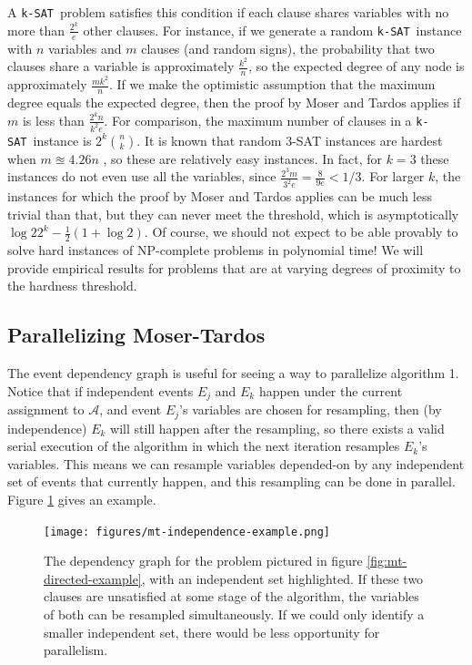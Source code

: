 \documentclass[twocolumn]{article}
\newcommand{\ksat}{\texttt{k-SAT}~}
\begin{document}
A \ksat problem satisfies this condition if each clause shares variables with no more than $\frac{2^k}{e}$ other clauses.  For instance, if we generate a random \ksat instance with $n$ variables and $m$ clauses (and random signs), the probability that two clauses share a variable is approximately $\frac{k^2}{n}$, so the expected degree of any node is approximately $\frac{m k^2}{n}$.  If we make the optimistic assumption that the maximum degree equals the expected degree, then the proof by Moser and Tardos applies if $m$ is less than $\frac{2^k n}{k^2 e}$.  For comparison, the maximum number of clauses in a \ksat instance is $2^k {n \choose k}$.  It is known that random 3-SAT instances are hardest when $m \approxeq 4.26 n$ \cite{gomes2008satisfiability}, so these are relatively easy instances.  In fact, for $k = 3$ these instances do not even use all the variables, since $\frac{2^3 m}{3^2 e} = \frac{8}{9e} < 1/3$.  For larger $k$, the instances for which the proof by Moser and Tardos applies can be much less trivial than that, but they can never meet the threshold, which is asymptotically $\log 2 2^k - \frac{1}{2}(1 + \log 2)$\cite{coja2014asymptotic}.  Of course, we should not expect to be able provably to solve hard instances of NP-complete problems in polynomial time!  We will provide empirical results for problems that are at varying degrees of proximity to the hardness threshold.

\subsection{Parallelizing Moser-Tardos}
The event dependency graph is useful for seeing a way to parallelize algorithm 1.  Notice that if independent events $E_j$ and $E_k$ happen under the current assignment to $\mathcal{A}$, and event $E_j$'s variables are chosen for resampling, then (by independence) $E_k$ will still happen after the resampling, so there exists a valid serial execution of the algorithm in which the next iteration resamples $E_k$'s variables.  This means we can resample variables depended-on by any independent set of events that currently happen, and this resampling can be done in parallel.  Figure \ref{fig:mt-independence-example} gives an example.

\begin{figure}[ht]
  \texttt{[image: figures/mt-independence-example.png]}
  \caption{The dependency graph for the problem pictured in figure \ref{fig:mt-directed-example}, with an independent set highlighted.  If these two clauses are unsatisfied at some stage of the algorithm, the variables of both can be resampled simultaneously.  If we could only identify a smaller independent set, there would be less opportunity for parallelism.}
  \label{fig:mt-independence-example}
\end{figure}
\end{document}
